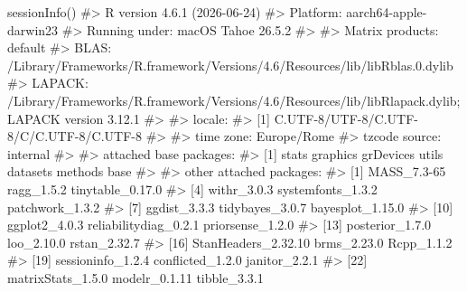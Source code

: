 \documentclass[
  italian,
  letterpaper,
  a4paper,
  11pt,
  open=any]{scrbook}
\newenvironment{Shaded}{\begin{snugshade}}{\end{snugshade}}
\newcommand{\CommentTok}[1]{\textcolor[rgb]{0.37,0.37,0.37}{#1}}
\newcommand{\FunctionTok}[1]{\textcolor[rgb]{0.28,0.35,0.67}{#1}}
\newcommand{\NormalTok}[1]{\textcolor[rgb]{0.00,0.23,0.31}{#1}}
\theoremstyle{plain}
\theoremstyle{definition}
\theoremstyle{definition}
\theoremstyle{remark}
\begin{document}
\begin{tcolorbox}[enhanced jigsaw, arc=.35mm, bottomrule=.15mm, bottomtitle=1mm, breakable, colback=white, colbacktitle=quarto-callout-note-color!10!white, colframe=quarto-callout-note-color-frame, coltitle=black, left=2mm, leftrule=.75mm, opacityback=0, opacitybacktitle=0.6, rightrule=.15mm, title=\textcolor{quarto-callout-note-color}{\faInfo}\hspace{0.5em}{Informazioni sull'ambiente di sviluppo}, titlerule=0mm, toprule=.15mm, toptitle=1mm]

\begin{Shaded}
\begin{Highlighting}[]
\FunctionTok{sessionInfo}\NormalTok{()}
\CommentTok{\#\textgreater{} R version 4.6.1 (2026{-}06{-}24)}
\CommentTok{\#\textgreater{} Platform: aarch64{-}apple{-}darwin23}
\CommentTok{\#\textgreater{} Running under: macOS Tahoe 26.5.2}
\CommentTok{\#\textgreater{} }
\CommentTok{\#\textgreater{} Matrix products: default}
\CommentTok{\#\textgreater{} BLAS:   /Library/Frameworks/R.framework/Versions/4.6/Resources/lib/libRblas.0.dylib }
\CommentTok{\#\textgreater{} LAPACK: /Library/Frameworks/R.framework/Versions/4.6/Resources/lib/libRlapack.dylib;  LAPACK version 3.12.1}
\CommentTok{\#\textgreater{} }
\CommentTok{\#\textgreater{} locale:}
\CommentTok{\#\textgreater{} [1] C.UTF{-}8/UTF{-}8/C.UTF{-}8/C/C.UTF{-}8/C.UTF{-}8}
\CommentTok{\#\textgreater{} }
\CommentTok{\#\textgreater{} time zone: Europe/Rome}
\CommentTok{\#\textgreater{} tzcode source: internal}
\CommentTok{\#\textgreater{} }
\CommentTok{\#\textgreater{} attached base packages:}
\CommentTok{\#\textgreater{} [1] stats     graphics  grDevices utils     datasets  methods   base     }
\CommentTok{\#\textgreater{} }
\CommentTok{\#\textgreater{} other attached packages:}
\CommentTok{\#\textgreater{}  [1] MASS\_7.3{-}65           ragg\_1.5.2            tinytable\_0.17.0     }
\CommentTok{\#\textgreater{}  [4] withr\_3.0.3           systemfonts\_1.3.2     patchwork\_1.3.2      }
\CommentTok{\#\textgreater{}  [7] ggdist\_3.3.3          tidybayes\_3.0.7       bayesplot\_1.15.0     }
\CommentTok{\#\textgreater{} [10] ggplot2\_4.0.3         reliabilitydiag\_0.2.1 priorsense\_1.2.0     }
\CommentTok{\#\textgreater{} [13] posterior\_1.7.0       loo\_2.10.0            rstan\_2.32.7         }
\CommentTok{\#\textgreater{} [16] StanHeaders\_2.32.10   brms\_2.23.0           Rcpp\_1.1.2           }
\CommentTok{\#\textgreater{} [19] sessioninfo\_1.2.4     conflicted\_1.2.0      janitor\_2.2.1        }
\CommentTok{\#\textgreater{} [22] matrixStats\_1.5.0     modelr\_0.1.11         tibble\_3.3.1         }

\end{Highlighting}
\end{Shaded}
\end{tcolorbox}
\end{document}

